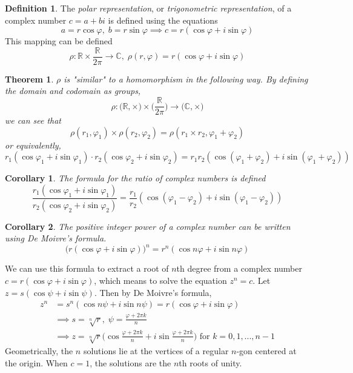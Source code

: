 \documentclass{article}
\newtheorem{theorem}{Theorem}[section]
\newtheorem{corollary}{Corollary}[theorem]
\theoremstyle{remark}
\theoremstyle{definition}
\newtheorem{definition}{Definition}[section]
\begin{document}
\begin{definition}
The \textit{polar representation}, or \textit{trigonometric representation}, of a complex number $c = a + b i$ is defined using the equations 
\[ a = r \cos{\varphi}, \; b = r\sin{\varphi} \implies c = r (\cos{\varphi} + i \sin{\varphi})\]
This mapping can be defined 
\[ \rho: \mathbb{R} \times \frac{\mathbb{R}}{2 \pi} \longrightarrow \mathbb{C}, \; \rho(r, \varphi) = r (\cos{\varphi} + i \sin{\varphi})\]
\end{definition}

\begin{theorem}
$\rho$ is "similar" to a homomorphism in the following way. By defining the domain and codomain as groups, 
\[ \rho: \big( \mathbb{R}, \times \big) \times \Big( \frac{\mathbb{R}}{2 \pi} \Big) \longrightarrow \big( \mathbb{C}, \times \big)\]
we can see that
\[ \rho (r_1, \varphi_1) \times \rho(r_2, \varphi_2) = \rho(r_1 \times r_2, \varphi_1 + \varphi_2) \]
or equivalently, 
\[r_1 (\cos{\varphi_1} + i \sin{\varphi_1}) \cdot r_2 (\cos{\varphi_2} + i \sin{\varphi_2}) = r_1 r_2 (\cos{(\varphi_1 + \varphi_2)} + i \sin{(\varphi_1 + \varphi_2)})\]
\end{theorem}

\begin{corollary}
The formula for the ratio of complex numbers is defined
\[ \frac{r_1 (\cos{\varphi_1} + i \sin{\varphi_1})}{r_2 (\cos{\varphi_2} + i \sin{\varphi_2})} = \frac{r_1}{r_2} (\cos{(\varphi_1 - \varphi_2)} + i \sin{(\varphi_1 - \varphi_2)})\]
\end{corollary}

\begin{corollary}
The positive integer power of a complex number can be written using \textit{De Moivre's formula}. 
\[ \big(r(\cos{\varphi} + i \sin{\varphi})\big)^n = r^n (\cos{n \varphi} + i \sin{n \varphi})\]
\end{corollary}

We can use this formula to extract a root of $n$th degree from a complex number $c = r(\cos{\varphi} + i \sin{\varphi})$, which means to solve the equation $z^n = c$. Let $z = s (\cos{\psi} + i \sin{\psi})$. Then by De Moivre's formula, 
\begin{align*}
    z^n & = s^n (\cos{n \psi} + i \sin{n \psi}) = r(\cos{\varphi} + i \sin{\varphi}) \\
    & \implies s = \sqrt[n]{r}, \; \psi = \frac{\varphi + 2\pi k}{n} \\
    & \implies z = \sqrt[n]{r} \bigg( \cos{\frac{\varphi + 2\pi k}{n}} + i \sin{\frac{\varphi + 2\pi k}{n}}\bigg) \text{ for } k = 0, 1, ..., n-1
\end{align*}
Geometrically, the $n$ solutions lie at the vertices of a regular $n$-gon centered at the origin. When $c = 1$, the solutions are the $n$th roots of unity.
\end{document}
